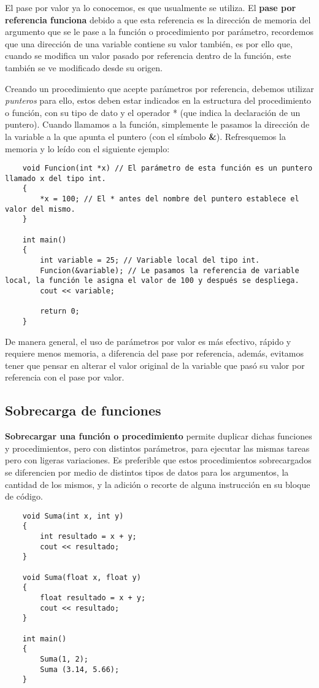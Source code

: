 El pase por valor ya lo conocemos, es que usualmente se utiliza. El \textbf{pase por referencia funciona} debido a que esta referencia es la dirección de memoria del argumento que se le pase a la función o procedimiento por parámetro, recordemos que una dirección de una variable contiene su valor también, es por ello que, cuando se modifica un valor pasado por referencia dentro de la función, este también se ve modificado desde su origen.

Creando un procedimiento que acepte parámetros por referencia, debemos utilizar \textit{punteros} para ello, estos deben estar indicados en la estructura del procedimiento o función, con su tipo de dato y el operador * (que indica la declaración de un puntero). Cuando llamamos a la función, simplemente le pasamos la dirección de la variable a la que apunta el puntero (con el símbolo \textbf{\&}). Refresquemos la memoria y lo leído con el siguiente ejemplo:
\begin{lstlisting}
    void Funcion(int *x) // El parámetro de esta función es un puntero llamado x del tipo int.
    {
        *x = 100; // El * antes del nombre del puntero establece el valor del mismo.
    }
    
    int main()
    {
        int variable = 25; // Variable local del tipo int.
        Funcion(&variable); // Le pasamos la referencia de variable local, la función le asigna el valor de 100 y después se despliega.
        cout << variable;
    
        return 0;
    }
\end{lstlisting}

De manera general, el uso de parámetros por valor es más efectivo, rápido y requiere menos memoria, a diferencia del pase por referencia, además, evitamos tener que pensar en alterar el valor original de la variable que pasó su valor por referencia con el pase por valor.


\subsection{Sobrecarga de funciones}

\textbf{Sobrecargar una función o procedimiento} permite duplicar dichas funciones y procedimientos, pero con distintos parámetros, para ejecutar las mismas tareas pero con ligeras variaciones. Es preferible que estos procedimientos sobrecargados se diferencien por medio de distintos tipos de datos para los argumentos, la cantidad de los mismos, y la adición o recorte de alguna instrucción en su bloque de código.
\begin{lstlisting}
    void Suma(int x, int y)
    {
        int resultado = x + y;
        cout << resultado;
    }
    
    void Suma(float x, float y)
    {
        float resultado = x + y;
        cout << resultado;
    }

    int main()
    {
        Suma(1, 2);
        Suma (3.14, 5.66);
    }
\end{lstlisting}

